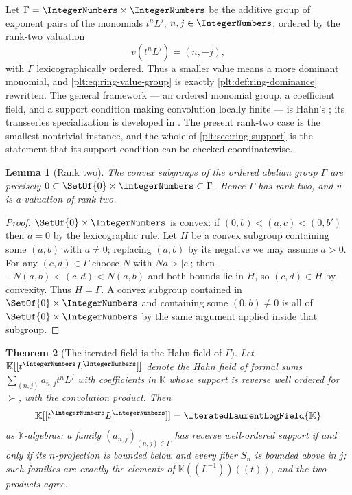 \documentclass[11pt,oneside]{article}
\theoremstyle{plain}
\newtheorem{theorem}{Theorem}[section]
\newtheorem{lemma}[theorem]{Lemma}
\theoremstyle{definition}
\theoremstyle{remark}
\newcommand{\K}{\mathbb{K}}
\newcommand{\PLit}{\IteratedLaurentLogField{\K}}         %
\newcommand{\succdom}{\succ}
\begin{document}
Let \(\Gamma=\IntegerNumbers\times\IntegerNumbers\) be the additive group of
exponent pairs of the monomials \(t^nL^j\), \(n,j\in\IntegerNumbers\), ordered
by the rank-two valuation
\begin{equation}\label{plt:eq:ring-value-group}
  v(t^nL^j)=(n,-j),
\end{equation}
with \(\Gamma\) lexicographically ordered.  Thus a smaller value means a more
dominant monomial, and \eqref{plt:eq:ring-value-group} is exactly
\cref{plt:def:ring-dominance} rewritten.  The general framework --- an ordered
monomial group, a coefficient field, and a support condition making
convolution locally finite --- is Hahn's \cite{hahn}; its transseries
specialization is developed in
\cite{edgar-beginners,vanderhoeven-book,adh-book}.  The present rank-two case
is the smallest nontrivial instance, and the whole of
\cref{plt:sec:ring-support} is the statement that its support condition can be
checked coordinatewise.

\begin{lemma}[Rank two]
\label{plt:lem:ring-rank-two-group}
The convex subgroups of the ordered abelian group \(\Gamma\) are precisely
\(0\subset\SetOf{0}\times\IntegerNumbers\subset\Gamma\).  Hence \(\Gamma\) has
rank two, and \(v\) is a valuation of rank two.
\end{lemma}

\begin{proof}
\(\SetOf{0}\times\IntegerNumbers\) is convex: if \((0,b)<(a,c)<(0,b')\) then
\(a=0\) by the lexicographic rule.  Let \(H\) be a convex subgroup containing
some \((a,b)\) with \(a\ne0\); replacing \((a,b)\) by its negative we may
assume \(a>0\).  For any \((c,d)\in\Gamma\) choose \(N\) with \(Na>|c|\);
then \(-N(a,b)<(c,d)<N(a,b)\) and both bounds lie in \(H\), so \((c,d)\in H\)
by convexity.  Thus \(H=\Gamma\).  A convex subgroup contained in
\(\SetOf{0}\times\IntegerNumbers\) and containing some \((0,b)\ne0\) is all of
\(\SetOf{0}\times\IntegerNumbers\) by the same argument applied inside that
subgroup.
\end{proof}

\begin{theorem}[The iterated field is the Hahn field of \(\Gamma\)]
\label{plt:thm:ring-hahn}
Let \(\K[[t^{\IntegerNumbers}L^{\IntegerNumbers}]]\) denote the Hahn field of
formal sums \(\sum_{(n,j)}a_{n,j}t^nL^j\) with coefficients in \(\K\) whose
support is reverse well ordered for \(\succdom\), with the convolution
product.  Then
\[
  \K[[t^{\IntegerNumbers}L^{\IntegerNumbers}]]=\PLit
\]
as \(\K\)-algebras: a family \((a_{n,j})_{(n,j)\in\Gamma}\) has reverse
well-ordered support if and only if its \(n\)-projection is bounded below and
every fiber \(S_n\) is bounded above in \(j\); such families are exactly the
elements of \(\K((L^{-1}))((t))\), and the two products agree.
\end{theorem}
\end{document}
